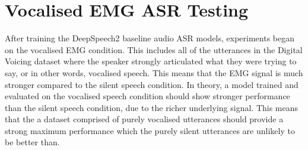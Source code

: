 \section{Vocalised EMG ASR Testing}

After training the DeepSpeech2 baseline audio ASR models, experiments
began on the vocalised EMG condition. This includes all of the utterances
in the Digital Voicing dataset where the speaker strongly articulated
what they were trying to say, or in other words, vocalised speech.
This means that the EMG signal is much stronger compared to the silent
speech condition. In theory, a model trained and evaluated on the vocalised
speech condition should show stronger performance than the silent speech
condition, due to the richer underlying signal. This means that the a dataset
comprised of purely vocalised utterances should provide a strong maximum
performance which the purely silent utterances are unlikely to be better
than.